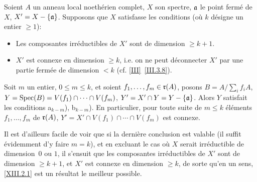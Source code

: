 \begin{theoreme} \label{XIII.2.1}
Soient $A$ un anneau local noeth\'erien complet, $X$ son spectre, $\mathfrak{a}$ le point ferm\'e de $X$, $X'=X-\{ \mathfrak{a}\}$. Supposons que $X$ satisfasse les conditions (o\`u $k$ d\'esigne un entier $\ge 1$):
\begin{itemize}
\item[a$_k$)] Les composantes irr\'eductibles de $X'$ sont de dimension $\ge k+1$.

\item[b$_k$)] $X'$ est connexe en dimension $\ge k$, i.e. on ne peut d\'econnecter $X'$ par une partie ferm\'ee de dimension $<k$ (cf. \ref{III}~\ref{III.3.8}).
\end{itemize}

Soit $m$ un entier, $0\le m\le k$, et soient $f_1, \dotsc, f_m\in \mathfrak{r}(A)$, posons $B=A/\sum_i f_iA$, $Y=\operatorname{Spec}(B)=V(f_1)\cap\dotsb\cap V(f_m)$, $Y'=X'\cap Y=Y-\{\mathfrak{a}\}$. Alors $Y$ satisfait les conditions a$_{k-m}$), b$_{k-m}$). En particulier, pour toute suite de $m\le k$ \'el\'ements $f_1, \dotsc, f_m$ de $\mathfrak{r}(A)$, $Y'=X'\cap V(f_1)\cap\dotsb\cap V(f_m)$ est connexe.
\end{theoreme}

Il est d'ailleurs facile de voir que si la derni\`ere conclusion est valable (il suffit \'evidemment d'y faire $m=k$), et en excluant le cas o\`u $X$ serait irr\'eductible de dimension~$0$ ou $1$, il s'ensuit que les composantes irr\'eductibles de $X'$ sont de dimension $\ge k+1$, et $X'$ est connexe en dimension $\geq k$, de sorte qu'en un sens, \ref{XIII.2.1} est un r\'esultat \og le meilleur possible\fg.

\bigskip

